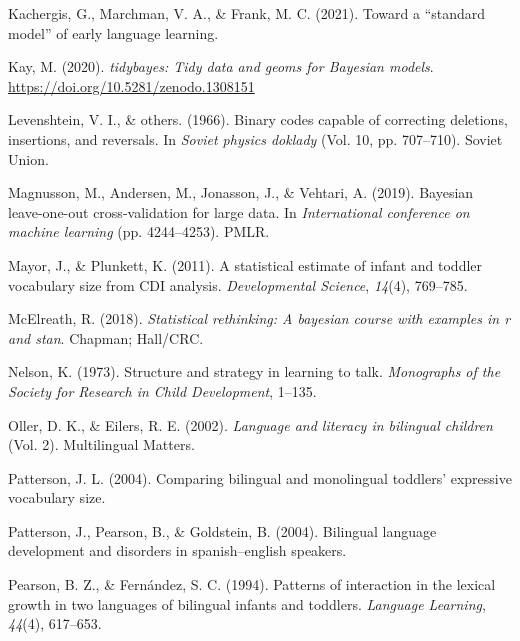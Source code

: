 \documentclass[
  english,
  man,man,floatsintext]{apa6}
\newlength{\cslhangindent}
\newenvironment{CSLReferences}[2] %
 {%
  \setlength{\parindent}{0pt}
  \ifodd #1 \everypar{\setlength{\hangindent}{\cslhangindent}}\ignorespaces\fi
  \ifnum #2 > 0
  \setlength{\parskip}{#2\baselineskip}
  \fi
 }%
 {}
\begin{document}
\begin{CSLReferences}{1}{0}
\leavevmode{}%
Kachergis, G., Marchman, V. A., \& Frank, M. C. (2021). Toward a {``standard model''} of early language learning.

\leavevmode{}%
Kay, M. (2020). \emph{{tidybayes}: Tidy data and geoms for {Bayesian} models}. \url{https://doi.org/10.5281/zenodo.1308151}

\leavevmode{}%
Levenshtein, V. I., \& others. (1966). Binary codes capable of correcting deletions, insertions, and reversals. In \emph{Soviet physics doklady} (Vol. 10, pp. 707--710). Soviet Union.

\leavevmode{}%
Magnusson, M., Andersen, M., Jonasson, J., \& Vehtari, A. (2019). Bayesian leave-one-out cross-validation for large data. In \emph{International conference on machine learning} (pp. 4244--4253). PMLR.

\leavevmode{}%
Mayor, J., \& Plunkett, K. (2011). A statistical estimate of infant and toddler vocabulary size from CDI analysis. \emph{Developmental Science}, \emph{14}(4), 769--785.

\leavevmode{}%
McElreath, R. (2018). \emph{Statistical rethinking: A bayesian course with examples in r and stan}. Chapman; Hall/CRC.

\leavevmode{}%
Nelson, K. (1973). Structure and strategy in learning to talk. \emph{Monographs of the Society for Research in Child Development}, 1--135.

\leavevmode{}%
Oller, D. K., \& Eilers, R. E. (2002). \emph{Language and literacy in bilingual children} (Vol. 2). Multilingual Matters.

\leavevmode{}%
Patterson, J. L. (2004). Comparing bilingual and monolingual toddlers' expressive vocabulary size.

\leavevmode{}%
Patterson, J., Pearson, B., \& Goldstein, B. (2004). Bilingual language development and disorders in spanish--english speakers.

\leavevmode{}%
Pearson, B. Z., \& Fernández, S. C. (1994). Patterns of interaction in the lexical growth in two languages of bilingual infants and toddlers. \emph{Language Learning}, \emph{44}(4), 617--653.


\end{CSLReferences}
\end{document}
